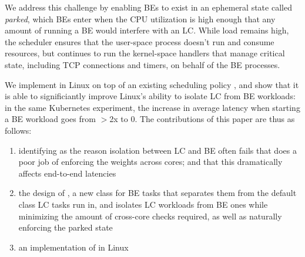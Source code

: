 We address this challenge by enabling BEs to exist in an ephemeral state called
\textit{parked}, which BEs enter when the CPU utilization is high enough that
any amount of running a BE would interfere with an LC. While load remains high,
the scheduler ensures that the user-space process doesn't run and consume
resources, but continues to run the kernel-space handlers that manage critical
state, including TCP connections and timers, on behalf of the BE processes. 

We implement \beclass{} in Linux on top of an existing scheduling policy
\schedidle{}, and show that it is able to significiantly improve Linux's ability
to isolate LC from BE workloads: in the same Kubernetes experiment, the increase
in average latency when starting a BE workload goes from $>$2x to 0. The
contributions of this paper are thus as follows: 
\begin{enumerate}
    \item identifying as the reason isolation between LC and BE often fails that
    \cgroups{} does a poor job of enforcing the weights across cores; and that
    this dramatically affects end-to-end latencies
    \item the design of \beclass{}, a new class for BE tasks that separates
    them from the default class LC tasks run in, and isolates LC workloads from
    BE ones while minimizing the amount of cross-core checks required, as well as
    naturally enforcing the parked state
    \item an implementation of \beclass{} in Linux
\end{enumerate}

